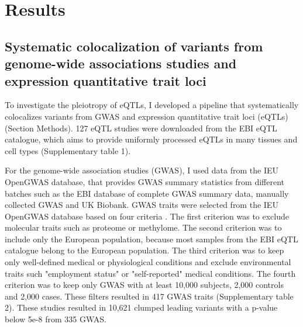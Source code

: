 \section*{Results}\label{s:results}

%
\subsection*{Systematic colocalization of variants from genome-wide associations studies and expression quantitative trait loci}
%


To investigate the pleiotropy of eQTLs, I developed a pipeline that systematically colocalizes variants from GWAS and expression quantitative trait loci (eQTLs) (Section Methods).
%
127 eQTL studies were downloaded from the EBI eQTL catalogue, which aims to provide uniformly processed eQTLs in many
tissues and cell types \cite{2021.Alasoo.Kerimov} (Supplementary table 1).

For the genome-wide association studies (GWAS), I used data from the IEU OpenGWAS database, that provides GWAS summary statistics
from different batches such as the EBI database of complete GWAS summary data, manually collected GWAS and UK Biobank.
%
GWAS traits were selected from the IEU OpenGWAS database based on four criteria \cite{2018.Parkinson.Buniello}.
%
The first criterion was to exclude molecular traits such as proteome or methylome.
%	
The second criterion was to include only the European population, because most
samples from the EBI eQTL catalogue belong to the European population.
%
The third criterion was to keep only well-defined medical or physiological
conditions and exclude environmental traits such "employment status" or "self-reported" medical conditions.
%
The fourth criterion was to keep only GWAS with at least 10,000 subjects, 2,000 controls and 2,000 cases.
%
These filters resulted in 417 GWAS traits (Supplementary table 2).
%
These studies resulted in 10,621 clumped leading variants with a p-value below 5e-8 from 335 GWAS.

